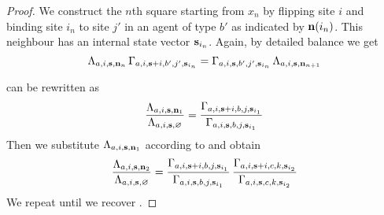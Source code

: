 \begin{proof}
  We construct the $n$th square
  starting from $x_n$ by flipping site $i$
  and binding site $i_n$ to site $j'$ in an agent of type $b'$
  as indicated by $\boldsymbol{\mathbf{n}}(i_n)$.
  This neighbour has an internal state vector $\boldsymbol{\mathbf{s}}_{i_n}$.
  Again, by detailed balance we get
  \begin{equation*}
    \label{eq:fbn}
    \Lambda_{a,i,\boldsymbol{\mathbf{s}},\boldsymbol{\mathbf{n}}_n} \,
    \Gamma_{a,i,\boldsymbol{\mathbf{s}}+i,b',j',\boldsymbol{\mathbf{s}}_{i_n}} =
    \Gamma_{a,i,\boldsymbol{\mathbf{s}},b',j',\boldsymbol{\mathbf{s}}_{i_n}} \,
    \Lambda_{a,i,\boldsymbol{\mathbf{s}},\boldsymbol{\mathbf{n}}_{n+1}}
  \end{equation*}

   can be rewritten as
  \begin{equation*}
    \frac{
      \Lambda_{a,i,\boldsymbol{\mathbf{s}},\boldsymbol{\mathbf{n}}_1}}{
      \Lambda_{a,i,\boldsymbol{\mathbf{s}},\varnothing}} =
    \frac{
      \Gamma_{a,i,\boldsymbol{\mathbf{s}}+i,
              b,j,\boldsymbol{\mathbf{s}}_{i_1}}}{
      \Gamma_{a,i,\boldsymbol{\mathbf{s}},
              b,j,\boldsymbol{\mathbf{s}}_{i_1}}}
  \end{equation*}
  Then we substitute $\Lambda_{a,i,\boldsymbol{\mathbf{s}},\boldsymbol{\mathbf{n}}_1}$
  according to  and obtain
  \begin{equation*}
    \frac{
      \Lambda_{a,i,\boldsymbol{\mathbf{s}},\boldsymbol{\mathbf{n}}_2}}{
      \Lambda_{a,i,\boldsymbol{\mathbf{s}},\varnothing}} =
    \frac{
      \Gamma_{a,i,\boldsymbol{\mathbf{s}}+i,
              b,j,\boldsymbol{\mathbf{s}}_{i_1}}}{
      \Gamma_{a,i,\boldsymbol{\mathbf{s}},
              b,j,\boldsymbol{\mathbf{s}}_{i_1}}} \,
    \frac{
      \Gamma_{a,i,\boldsymbol{\mathbf{s}}+i,
              c,k,\boldsymbol{\mathbf{s}}_{i_2}}}{
      \Gamma_{a,i,\boldsymbol{\mathbf{s}},
              c,k,\boldsymbol{\mathbf{s}}_{i_2}}}
  \end{equation*}
  We repeat until we recover .
\end{proof}





